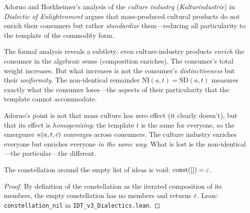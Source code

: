 \begin{interpretation}
\label{interp:culture-industry}
Adorno and Horkheimer's analysis of the \emph{culture industry}
(\textit{Kulturindustrie}) in \textit{Dialectic of Enlightenment} argues that
mass-produced cultural products do not enrich their consumers but rather
\emph{standardize} them---reducing all particularity to the template of the
commodity form.

The formal analysis reveals a subtlety: even culture-industry products
\emph{enrich} the consumer in the algebraic sense (composition enriches). The
consumer's total weight increases. But what increases is not the consumer's
\emph{distinctiveness} but their \emph{uniformity}. The non-identical
remainder $\mathrm{NI}(a, t) = \mathrm{SD}(a, t)$ measures exactly what the
consumer loses---the aspects of their particularity that the template cannot
accommodate.

Adorno's point is not that mass culture has zero effect (it clearly doesn't),
but that its effect is \emph{homogenizing}: the template $t$ is the same for
everyone, so the emergence $\kappa(a, t, c)$ converges across consumers.
The culture industry enriches everyone but enriches everyone \emph{in the
same way}. What is lost is the non-identical---the particular---the different.
\end{interpretation}

\begin{theorem}
\label{thm:constellation-nil}
The constellation around the empty list of ideas is void:
$\mathrm{const}([]) = \varepsilon$.
\end{theorem}

\begin{proof}
By definition of the constellation as the iterated composition of its members,
the empty constellation has no members and returns $\varepsilon$.
Lean: \texttt{constellation\_nil} in \texttt{IDT\_v3\_Dialectics.lean}.
\end{proof}

